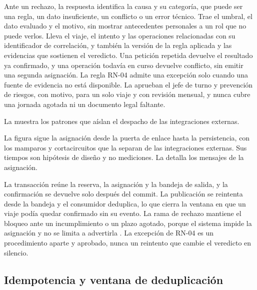 Ante un rechazo, la respuesta identifica la causa y su categoría, que puede ser una regla, un dato
insuficiente, un conflicto o un error técnico. Trae el umbral, el dato evaluado y el motivo, sin mostrar
antecedentes personales a un rol que no puede verlos. Lleva el viaje, el intento y las operaciones
relacionadas con su identificador de correlación, y también la versión de la regla aplicada y las
evidencias que sostienen el veredicto. Una petición repetida devuelve el resultado ya confirmado, y una
operación todavía en curso devuelve conflicto, sin emitir una segunda asignación. La regla RN-04 admite
una excepción solo cuando una fuente de evidencia no está disponible. La aprueban el jefe de turno y
prevención de riesgos, con motivo, para un solo viaje y con revisión mensual, y nunca cubre una jornada
agotada ni un documento legal faltante.

La  muestra los patrones que aíslan el despacho de las integraciones externas.


La figura sigue la asignación desde la puerta de enlace hasta la persistencia, con los mamparos y
cortacircuitos que la separan de las integraciones externas. Sus tiempos son hipótesis de diseño y no
mediciones. La  detalla los mensajes de la asignación.


La transacción reúne la reserva, la asignación y la bandeja de salida, y la confirmación se devuelve solo
después del commit. La publicación se reintenta desde la bandeja y el consumidor deduplica, lo que cierra
la ventana en que un viaje podía quedar confirmado sin su evento. La rama de rechazo mantiene el bloqueo
ante un incumplimiento o un plazo agotado, porque el sistema impide la asignación y no se limita a
advertirla . La excepción de RN-04 es un procedimiento aparte y aprobado, nunca
un reintento que cambie el veredicto en silencio.

\subsection{Idempotencia y ventana de deduplicación}\label{sec:4-idempotencia}

